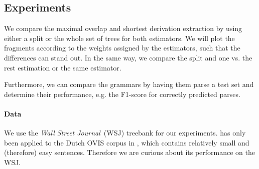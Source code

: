 \subsection{Experiments}


We compare the maximal overlap and shortest derivation extraction by using either a split or the whole set of trees for both estimators. We will plot the fragments according to the weights assigned by the estimators, such that the differences can stand out. In the same way, we compare the split and one vs. the rest estimation or the same estimator.

Furthermore, we can compare the grammars by having them parse a test set and determine their performance, e.g. the F1-score for correctly predicted parses.

\paragraph{Data}
We use the \emph{Wall Street Journal}~(WSJ) treebank for our experiments. \dops{} has only been applied to the Dutch OVIS corpus in \cite{zollmann2005}, which contains relatively small and (therefore) easy sentences. Therefore we are curious about its performance on the WSJ.

